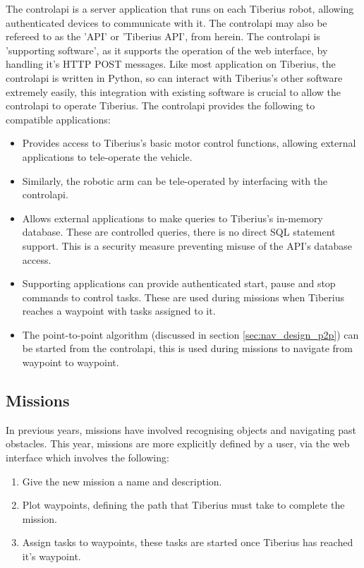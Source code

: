 The \gls{controlapi} is a server application that runs on each Tiberius robot, allowing authenticated devices to communicate with it. The \gls{controlapi} may also be refereed to as the 'API' or 'Tiberius API', from herein. The \gls{controlapi} is 'supporting software', as it supports the operation of the web interface, by handling it's \gls{HTTP} \gls{POST} messages. Like most application on Tiberius, the \gls{controlapi} is written in Python, so can interact with Tiberius's other software extremely easily, this integration with existing software is crucial to allow the \gls{controlapi} to operate Tiberius. The \gls{controlapi} provides the following to compatible applications:

\begin{itemize}
\item Provides access to Tiberius's basic motor control functions, allowing external applications to tele-operate the vehicle.

\item Similarly, the robotic arm can be tele-operated by interfacing with the \gls{controlapi}.

\item Allows external applications to make queries to Tiberius's in-memory database. These are controlled queries, there is no direct SQL statement support. This is a security measure preventing misuse of the API's database access.

\item Supporting applications can provide authenticated start, pause and stop commands to control tasks. These are used during missions when Tiberius reaches a waypoint with tasks assigned to it.

\item The point-to-point algorithm (discussed in section \ref{sec:nav_design_p2p}) can be started from the \gls{controlapi}, this is used during missions to navigate from waypoint to waypoint.

\end{itemize}

\subsection{Missions}
In previous years, missions have involved recognising objects and navigating past obstacles. This year, missions are more explicitly defined by a user, via the web interface which involves the following:

\begin{enumerate}
\item Give the new mission a name and description.
\item Plot waypoints, defining the path that Tiberius must take to complete the mission.
\item Assign tasks to waypoints, these tasks are started once Tiberius has reached it's waypoint.
\end{enumerate}

